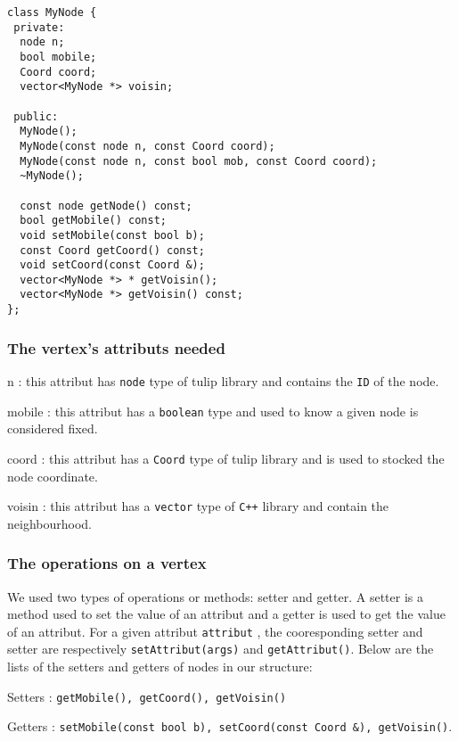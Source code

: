 \newpage
\begin{lstlisting}
class MyNode {
 private:
  node n;
  bool mobile;
  Coord coord;  
  vector<MyNode *> voisin;

 public:
  MyNode();
  MyNode(const node n, const Coord coord);
  MyNode(const node n, const bool mob, const Coord coord);
  ~MyNode();
  
  const node getNode() const;
  bool getMobile() const;
  void setMobile(const bool b);
  const Coord getCoord() const;
  void setCoord(const Coord &);
  vector<MyNode *> * getVoisin();
  vector<MyNode *> getVoisin() const;
};
\end{lstlisting}

\subsubsection{The vertex's attributs needed}
\begin{dinglist}{70}
\item[n]: this attribut has \texttt{node} type of \textsf{tulip} library and contains the \texttt{ID} of the node.  
\item[mobile]: this attribut has a \texttt{boolean} type and used to know a given node is considered fixed.
\item[coord]: this attribut has a \texttt{Coord} type of \textsf{tulip} library and is used to stocked the node coordinate. 
\item[voisin]: this attribut has a \texttt{vector} type of \texttt{C++} library and contain the neighbourhood.
\end{dinglist}

\subsubsection{The operations on a vertex}
We used two types of operations or methods: \textsf{setter} and
\textsf{getter}. A \textsf{setter} is a method used to set the value
of an attribut and a \textsf{getter} is used to get the value of an
attribut. For a given attribut \texttt{attribut} , the cooresponding
setter and setter are respectively \verb+setAttribut(args)+ and \verb+getAttribut()+. Below are the lists of the setters and getters of nodes in our structure:
\begin{dinglist}{70}
\item[Setters]: \verb+getMobile(), getCoord(), getVoisin()+  
\item[Getters]: \verb+setMobile(const bool b), setCoord(const Coord &), getVoisin()+.
\end{dinglist}

\newpage
